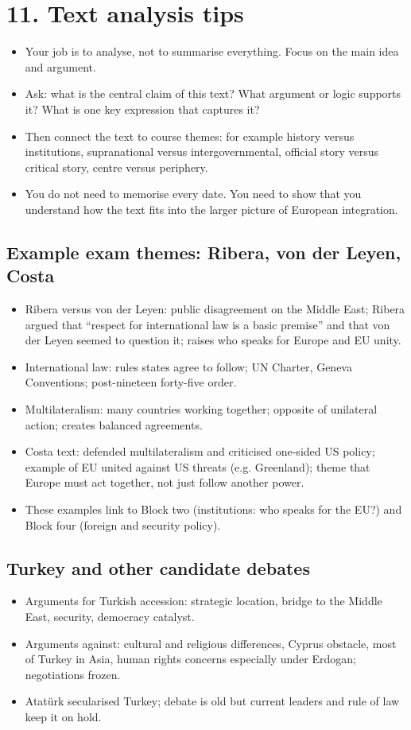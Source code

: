 \documentclass[10pt,a4paper]{article}
\begin{document}
\section*{11. Text analysis tips}
\begin{itemize}
\item Your job is to analyse, not to summarise everything. Focus on the main idea and argument.
\item Ask: what is the central claim of this text? What argument or logic supports it? What is one key expression that captures it?
\item Then connect the text to course themes: for example history versus institutions, supranational versus intergovernmental, official story versus critical story, centre versus periphery.
\item You do not need to memorise every date. You need to show that you understand how the text fits into the larger picture of European integration.
\end{itemize}

\subsection*{Example exam themes: Ribera, von der Leyen, Costa}
\begin{itemize}
\item Ribera versus von der Leyen: public disagreement on the Middle East; Ribera argued that ``respect for international law is a basic premise'' and that von der Leyen seemed to question it; raises who speaks for Europe and EU unity.
\item International law: rules states agree to follow; UN Charter, Geneva Conventions; post-nineteen forty-five order.
\item Multilateralism: many countries working together; opposite of unilateral action; creates balanced agreements.
\item Costa text: defended multilateralism and criticised one-sided US policy; example of EU united against US threats (e.g. Greenland); theme that Europe must act together, not just follow another power.
\item These examples link to Block two (institutions: who speaks for the EU?) and Block four (foreign and security policy).
\end{itemize}

\subsection*{Turkey and other candidate debates}
\begin{itemize}
\item Arguments for Turkish accession: strategic location, bridge to the Middle East, security, democracy catalyst.
\item Arguments against: cultural and religious differences, Cyprus obstacle, most of Turkey in Asia, human rights concerns especially under Erdogan; negotiations frozen.
\item Atatürk secularised Turkey; debate is old but current leaders and rule of law keep it on hold.
\end{itemize}
\end{document}
